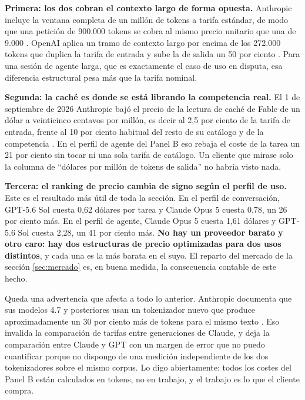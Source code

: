 \documentclass[11pt,letterpaper]{article}
\begin{document}
\textbf{Primera: los dos cobran el contexto largo de forma opuesta.} Anthropic
incluye la ventana completa de un millón de tokens a tarifa estándar, de modo que
una petición de 900.000 tokens se cobra al mismo precio unitario que una de 9.000
\parencite{anthropic2026precios}. OpenAI aplica un tramo de contexto largo por
encima de los 272.000 tokens que duplica la tarifa de entrada y sube la de salida
un 50 por ciento \parencite{openai2026precios}. Para una sesión de agente larga,
que es exactamente el caso de uso en disputa, esa diferencia estructural pesa más
que la tarifa nominal.

\textbf{Segunda: la caché es donde se está librando la competencia real.} El 1 de
septiembre de 2026 Anthropic bajó el precio de la lectura de caché de Fable de un
dólar a veinticinco centavos por millón, es decir al 2,5 por ciento de la tarifa
de entrada, frente al 10 por ciento habitual del resto de su catálogo y de la
competencia \parencite{anthropic2026precios,venturebeat2026fable51}. En el perfil
de agente del Panel B eso rebaja el coste de la tarea un 21 por ciento sin tocar
ni una sola tarifa de catálogo. Un cliente que mirase solo la columna de
\enquote{dólares por millón de tokens de salida} no habría visto nada.

\textbf{Tercera: el ranking de precio cambia de signo según el perfil de uso.}
Este es el resultado más útil de toda la sección. En el perfil de conversación,
GPT-5.6 Sol cuesta 0,62 dólares por tarea y Claude Opus 5 cuesta 0,78, un 26 por
ciento más. En el perfil de agente, Claude Opus 5 cuesta 1,61 dólares y GPT-5.6
Sol cuesta 2,28, un 41 por ciento más. \textbf{No hay un proveedor barato y otro
caro: hay dos estructuras de precio optimizadas para dos usos distintos}, y cada
una es la más barata en el suyo. El reparto del mercado de la sección \ref{sec:mercado} es, en
buena medida, la consecuencia contable de este hecho.

Queda una advertencia que afecta a todo lo anterior. Anthropic documenta que sus
modelos 4.7 y posteriores usan un tokenizador nuevo que produce aproximadamente un
30 por ciento más de tokens para el mismo texto \parencite{anthropic2026precios}.
Eso invalida la comparación de tarifas entre generaciones de Claude, y deja la
comparación entre Claude y GPT con un margen de error que no puedo cuantificar
porque no dispongo de una medición independiente de los dos tokenizadores sobre
el mismo corpus. Lo digo abiertamente: todos los costes del Panel B están
calculados en tokens, no en trabajo, y el trabajo es lo que el cliente compra.
\end{document}
